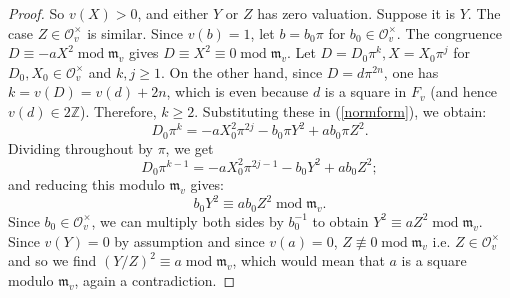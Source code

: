 \documentclass[10pt,a4paper]{amsart}
\begin{document}
\begin{proof}
    So $v(X)>0$, and either $Y$ or $Z$ has zero valuation. Suppose it is $Y$. The case $Z\in\mathcal{O}_v^\times$ is similar. Since $v(b) = 1$, let $b = b_0\pi$ for $b_0\in\mathcal{O}_v^\times$. The congruence $D\equiv -aX^2\operatorname{mod}\mathfrak{m}_v$ gives $D\equiv X^2\equiv 0\operatorname{mod}\mathfrak{m}_v$. Let $D = D_0\pi^k, X= X_0\pi^j$ for $D_0,X_0\in\mathcal{O}_v^\times$ and $k,j\geq 1$. On the other hand, since $D = d\pi^{2n}$, one has $k = v(D) = v(d) + 2n$, which is even because $d$ is a square in $F_v$ (and hence $v(d)\in 2\mathbb{Z}$). Therefore, $k\geq 2$. Substituting these in (\ref{normform}), we obtain:\begin{equation}
        D_0\pi^k = -aX_0^2\pi^{2j} - b_0\pi Y^2 + ab_0\pi Z^2.
    \end{equation}
    Dividing throughout by $\pi$, we get
    \begin{equation}
        D_0\pi^{k-1} = -aX_0^2\pi^{2j-1} - b_0Y^2 + ab_0Z^2;
    \end{equation}
    and reducing this modulo $\mathfrak{m}_v$ gives:\begin{equation}
        b_0Y^2\equiv ab_0Z^2\operatorname{mod}\mathfrak{m}_v.
    \end{equation}
    Since $b_0\in\mathcal{O}_v^\times$, we can multiply both sides by $b_0^{-1}$ to obtain $Y^2\equiv aZ^2\operatorname{mod}\mathfrak{m}_v$. Since $v(Y) = 0$ by assumption and since $v(a)=0$, $Z\not\equiv 0\operatorname{mod}\mathfrak{m}_v$ i.e. $Z\in\mathcal{O}_v^\times$ and so we find $(Y/Z)^2\equiv a\operatorname{mod}\mathfrak{m}_v$, which would mean that $a$ is a square modulo $\mathfrak{m}_v$, again a contradiction.
\end{proof}
\end{document}
